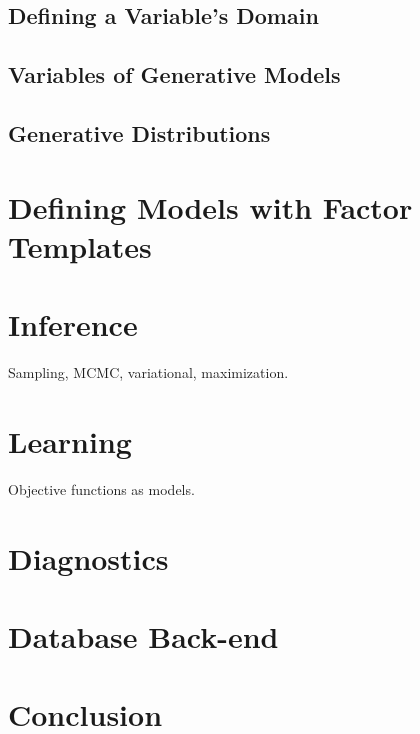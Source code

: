 \documentclass[]{manual}
\begin{document}
\section{Defining a Variable's Domain}
\section{Variables of Generative Models}
\section{Generative Distributions}


\chapter{Defining Models with Factor Templates}
\label{chap:models}


\chapter{Inference}
\label{chap:inference}

Sampling, MCMC, variational, maximization.


\chapter{Learning}
\label{chap:learning}

Objective functions as models.


\chapter{Diagnostics}
\label{chap:diagnostics}

\chapter{Database Back-end}
\label{chap:database}

\chapter{Conclusion}
\label{chap:conclusion}





\end{document}
